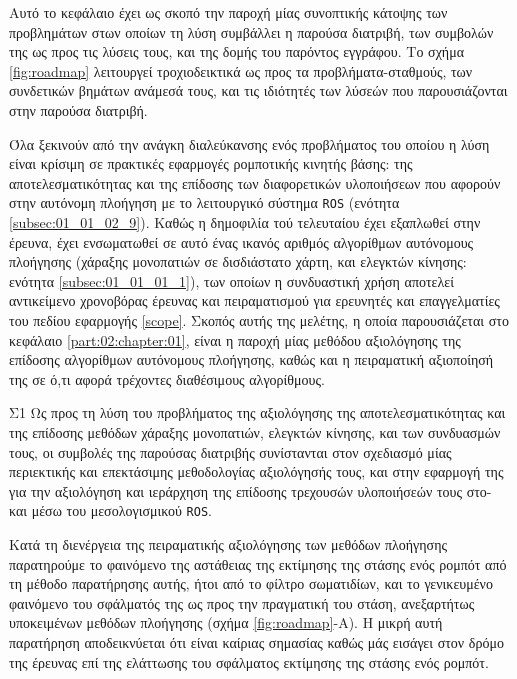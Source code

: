 Αυτό το κεφάλαιο έχει ως σκοπό την παροχή μίας συνοπτικής κάτοψης των
προβλημάτων στων οποίων τη λύση συμβάλλει η παρούσα διατριβή, των συμβολών της
ως προς τις λύσεις τους, και της δομής του παρόντος εγγράφου. Το σχήμα
\ref{fig:roadmap} λειτουργεί τροχιοδεικτικά ως προς τα προβλήματα-σταθμούς, των
συνδετικών βημάτων ανάμεσά τους, και τις ιδιότητές των λύσεών που παρουσιάζονται
στην παρούσα διατριβή.

Όλα ξεκινούν από την ανάγκη διαλεύκανσης ενός προβλήματος του οποίου η λύση
είναι κρίσιμη σε πρακτικές εφαρμογές ρομποτικής κινητής βάσης: της
αποτελεσματικότητας και της επίδοσης των διαφορετικών υλοποιήσεων που αφορούν
στην αυτόνομη πλοήγηση με το λειτουργικό σύστημα \texttt{ROS} (ενότητα
\ref{subsec:01_01_02_9}). Καθώς η δημοφιλία τού τελευταίου έχει εξαπλωθεί στην
έρευνα, έχει ενσωματωθεί σε αυτό ένας ικανός αριθμός αλγορίθμων αυτόνομους
πλοήγησης (χάραξης μονοπατιών σε δισδιάστατο χάρτη, και ελεγκτών κίνησης:
ενότητα \ref{subsec:01_01_01_1}), των οποίων η συνδυαστική χρήση αποτελεί
αντικείμενο χρονοβόρας έρευνας και πειραματισμού για ερευνητές και
επαγγελματίες του πεδίου εφαρμογής \ref{scope}. Σκοπός αυτής της μελέτης, η
οποία παρουσιάζεται στο κεφάλαιο \ref{part:02:chapter:01}, είναι η παροχή μίας
μεθόδου αξιολόγησης της επίδοσης αλγορίθμων αυτόνομους πλοήγησης, καθώς και η
πειραματική αξιοποίησή της σε ό,τι αφορά τρέχοντες διαθέσιμους αλγορίθμους.

\begin{bw_box}
\begin{customcontribution}{Σ1}
  Ως προς τη λύση του προβλήματος της αξιολόγησης της αποτελεσματικότητας και
  της επίδοσης μεθόδων χάραξης μονοπατιών, ελεγκτών κίνησης, και των συνδυασμών
  τους, οι συμβολές της παρούσας διατριβής συνίστανται στον σχεδιασμό μίας
  περιεκτικής και επεκτάσιμης μεθοδολογίας αξιολόγησής τους, και στην εφαρμογή
  της για την αξιολόγηση και ιεράρχηση της επίδοσης τρεχουσών υλοποιήσεών τους
  στο- και μέσω του μεσολογισμικού \texttt{ROS}.
\end{customcontribution}
\end{bw_box}

Κατά τη διενέργεια της πειραματικής αξιολόγησης των μεθόδων πλοήγησης
παρατηρούμε το φαινόμενο της αστάθειας της εκτίμησης της στάσης ενός ρομπότ
από τη μέθοδο παρατήρησης αυτής, ήτοι από το φίλτρο σωματιδίων, και το
γενικευμένο φαινόμενο του σφάλματός της ως προς την πραγματική του στάση,
ανεξαρτήτως υποκειμένων μεθόδων πλοήγησης (σχήμα \ref{fig:roadmap}-Α). Η μικρή
αυτή παρατήρηση αποδεικνύεται ότι είναι καίριας σημασίας καθώς μάς εισάγει στον
δρόμο της έρευνας επί της ελάττωσης του σφάλματος εκτίμησης της στάσης ενός
ρομπότ.\\

